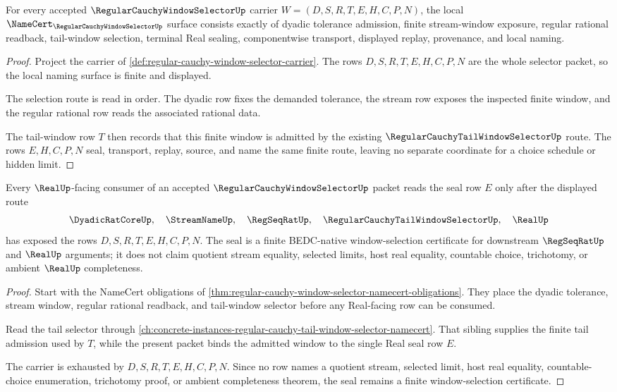 \begin{theorem}
\label{thm:regular-cauchy-window-selector-namecert-obligations}
For every accepted $\RegularCauchyWindowSelectorUp$ carrier $W=(D,S,R,T,E,H,C,P,N)$, the local $\NameCert_{\RegularCauchyWindowSelectorUp}$ surface consists exactly of dyadic tolerance admission, finite stream-window exposure, regular rational readback, tail-window selection, terminal Real sealing, componentwise transport, displayed replay, provenance, and local naming.
\end{theorem}
\begin{proof}
Project the carrier of \autoref{def:regular-cauchy-window-selector-carrier}. The rows $D,S,R,T,E,H,C,P,N$ are the whole selector packet, so the local naming surface is finite and displayed.

The selection route is read in order. The dyadic row fixes the demanded tolerance, the stream row exposes the inspected finite window, and the regular rational row reads the associated rational data.

The tail-window row $T$ then records that this finite window is admitted by the existing $\RegularCauchyTailWindowSelectorUp$ route. The rows $E,H,C,P,N$ seal, transport, replay, source, and name the same finite route, leaving no separate coordinate for a choice schedule or hidden limit.
\end{proof}

\begin{theorem}
\label{thm:regular-cauchy-window-selector-real-seal}
Every $\RealUp$-facing consumer of an accepted $\RegularCauchyWindowSelectorUp$ packet reads the seal row $E$ only after the displayed route
$$
\DyadicRatCoreUp,\quad \StreamNameUp,\quad \RegSeqRatUp,\quad \RegularCauchyTailWindowSelectorUp,\quad \RealUp
$$
has exposed the rows $D,S,R,T,E,H,C,P,N$. The seal is a finite BEDC-native window-selection certificate for downstream $\RegSeqRatUp$ and $\RealUp$ arguments; it does not claim quotient stream equality, selected limits, host real equality, countable choice, trichotomy, or ambient $\RealUp$ completeness.
\end{theorem}
\begin{proof}
Start with the NameCert obligations of \autoref{thm:regular-cauchy-window-selector-namecert-obligations}. They place the dyadic tolerance, stream window, regular rational readback, and tail-window selector before any Real-facing row can be consumed.

Read the tail selector through \autoref{ch:concrete-instances-regular-cauchy-tail-window-selector-namecert}. That sibling supplies the finite tail admission used by $T$, while the present packet binds the admitted window to the single Real seal row $E$.

The carrier is exhausted by $D,S,R,T,E,H,C,P,N$. Since no row names a quotient stream, selected limit, host real equality, countable-choice enumeration, trichotomy proof, or ambient completeness theorem, the seal remains a finite window-selection certificate.
\end{proof}

